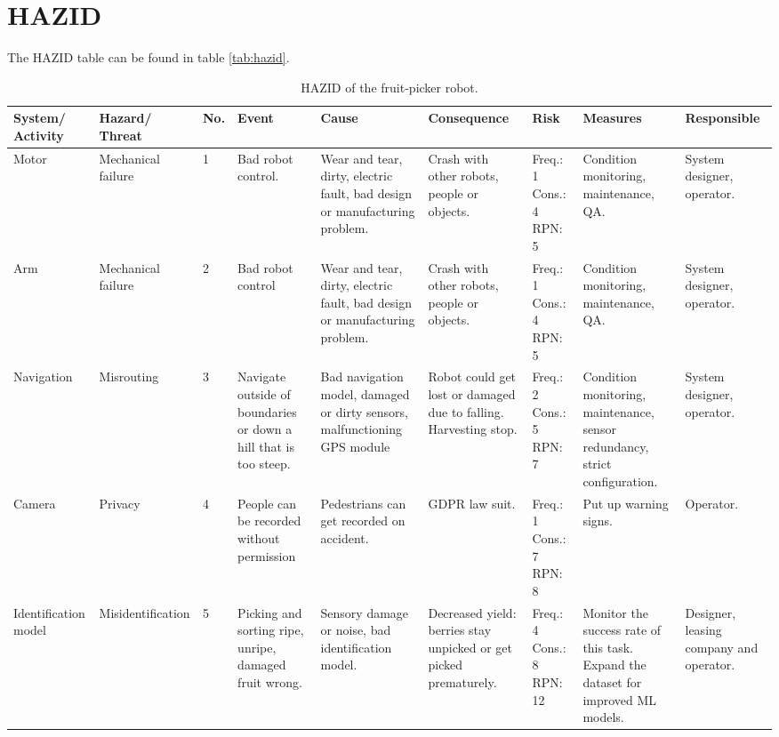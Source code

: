 \documentclass[%
oneside,    %
project,    %
nosummary   %
]{USN-MSc}
\begin{document}
\section{HAZID}
The HAZID table can be found in table \ref{tab:hazid}.

\begin{landscape}
\begin{table}[!ht]
  \caption{HAZID of the fruit-picker robot.}
   \centering
    \begin{tabular}{ | m{2cm} | m{2cm} | m{1cm} | m{3cm} | m{3cm} | m{3cm} | m{2cm} | m{2cm} | m{2cm} |}
     \hline
     System/ Activity & Hazard/ Threat & No. & Event & Cause & Consequence & Risk & Measures & Responsible \\ \hline

     Motor & Mechanical failure & 1 & Bad robot control. & Wear and tear, dirty, electric fault, bad design or manufacturing problem. & Crash with other robots, people or objects. & Freq.: 1 Cons.: 4 RPN: 5 & Condition monitoring, maintenance, QA. & System designer, operator. \\ \hline

     Arm & Mechanical failure & 2 & Bad robot control & Wear and tear, dirty, electric fault, bad design or manufacturing problem. & Crash with other robots, people or objects. & Freq.: 1 Cons.: 4 RPN: 5 & Condition monitoring, maintenance, QA. & System designer, operator. \\ \hline

     Navigation & Misrouting & 3 & Navigate outside of boundaries or down a hill that is too steep. & Bad navigation model, damaged or dirty sensors, malfunctioning GPS module & Robot could get lost or damaged due to falling. Harvesting stop. & Freq.: 2 Cons.: 5 RPN: 7 & Condition monitoring, maintenance, sensor redundancy, strict configuration. & System designer, operator. \\ \hline

     Camera & Privacy & 4 & People can be recorded without permission & Pedestrians can get recorded on accident. & GDPR law suit. & Freq.: 1 Cons.: 7 RPN: 8 & Put up warning signs. & Operator. \\ \hline

     Identification model & Misidentification & 5 & Picking and sorting ripe, unripe, damaged fruit wrong. & Sensory damage or noise, bad identification model. & Decreased yield: berries stay unpicked or get picked prematurely. & Freq.: 4 Cons.: 8 RPN: 12 & Monitor the success rate of this task. Expand the dataset for improved ML models. & Designer, leasing company and operator. \\ \hline


\end{tabular}
\end{table}
\end{landscape}
\end{document}
